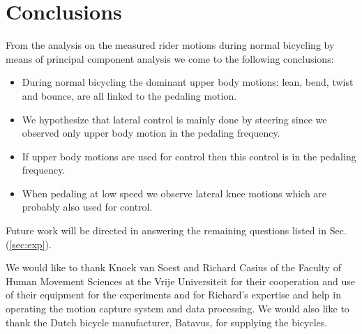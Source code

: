 \section{Conclusions}
\label{sec:conclusions}
From the analysis on the measured rider motions during normal bicycling by
means of principal component analysis we come to the following conclusions:
\begin{itemize}
	\item During normal bicycling the dominant upper body motions:  lean, bend,
        twist and bounce, are all linked to the pedaling motion.
	\item We hypothesize that lateral control is mainly done by steering since
        we observed only upper body motion in the pedaling frequency.
	\item If upper body motions are used for control then this control is in
        the pedaling frequency.
	\item When pedaling at low speed we observe lateral knee motions which are
        probably also used for control.
\end{itemize}
Future work will be directed in answering the remaining questions listed in
Sec. (\ref{sec:exp}).
\begin{acknowledgements}
We would like to thank Knoek van Soest and Richard Casius of the Faculty of
Human Movement Sciences at the Vrije Universiteit for their cooperation and use
of their equipment for the experiments and for Richard's expertise and help in
operating the motion capture system and data processing. We would also like to
thank the Dutch bicycle manufacturer, Batavus, for supplying the bicycles.
\end{acknowledgements}


